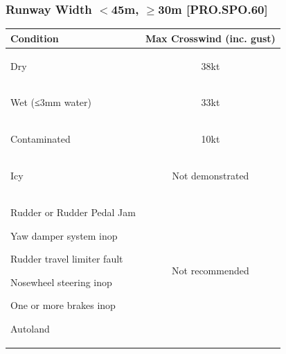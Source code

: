 \documentclass[twoside]{article}
\renewcommand{\ref}[1]{{\color{blue}\scriptsize [#1]}}
\begin{document}
{\subsubsection{Runway Width $<$45m, $\ge$30m \ref{PRO.SPO.60}}
\begin{center}
\begin{tabular}{|l|c|}\hline
  \parbox{0.5\textwidth}{
  \centering Condition}
  & Max Crosswind (inc. gust)\\\hline
  \parbox{0.5\textwidth}{
    \vspace{1mm}
    \begin{compactitem}
    \item Dry
    \end{compactitem}
    \vspace{1mm}} & 38kt\\\hline
  \parbox{0.5\textwidth}{
    \vspace{1mm}
    \begin{compactitem}
    \item Wet (≤3mm water)
    \end{compactitem}
    \vspace{1mm}} & 33kt\\\hline
  \parbox{0.5\textwidth}{
    \vspace{1mm}
    \begin{compactitem}
    \item Contaminated
    \end{compactitem}
    \vspace{1mm}} & 10kt\\\hline
  \parbox{0.5\textwidth}{
    \vspace{1mm}
    \begin{compactitem}
    \item Icy
    \end{compactitem}
    \vspace{1mm}} & Not demonstrated\\\hline
  \parbox{0.5\textwidth}{
    \vspace{1mm}
    \begin{compactitem}
    \item Rudder or Rudder Pedal Jam
    \item Yaw damper system inop
    \item Rudder travel limiter fault
    \item Nosewheel steering inop
    \item One or more brakes inop
    \item Autoland
    \end{compactitem}
    \vspace{1mm}} & Not recommended\\\hline
\end{tabular}
\end{center}
}
\end{document}
